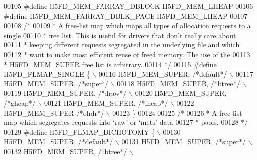 \begin{DoxyCode}
00105 \textcolor{preprocessor}{#define H5FD\_MEM\_FARRAY\_DBLOCK  H5FD\_MEM\_LHEAP}
00106 \textcolor{preprocessor}{#define H5FD\_MEM\_FARRAY\_DBLK\_PAGE  H5FD\_MEM\_LHEAP}
00107 
00108 \textcolor{comment}{/*}
00109 \textcolor{comment}{ * A free-list map which maps all types of allocation requests to a single}
00110 \textcolor{comment}{ * free list.  This is useful for drivers that don't really care about}
00111 \textcolor{comment}{ * keeping different requests segregated in the underlying file and which}
00112 \textcolor{comment}{ * want to make most efficient reuse of freed memory.  The use of the}
00113 \textcolor{comment}{ * H5FD\_MEM\_SUPER free list is arbitrary.}
00114 \textcolor{comment}{ */}
00115 \textcolor{preprocessor}{#define H5FD\_FLMAP\_SINGLE \{                           \(\backslash\)}
00116 \textcolor{preprocessor}{    H5FD\_MEM\_SUPER,         }\textcolor{comment}{/*default*/}\textcolor{preprocessor}{               \(\backslash\)}
00117 \textcolor{preprocessor}{    H5FD\_MEM\_SUPER,         }\textcolor{comment}{/*super*/}\textcolor{preprocessor}{                 \(\backslash\)}
00118 \textcolor{preprocessor}{    H5FD\_MEM\_SUPER,         }\textcolor{comment}{/*btree*/}\textcolor{preprocessor}{                 \(\backslash\)}
00119 \textcolor{preprocessor}{    H5FD\_MEM\_SUPER,         }\textcolor{comment}{/*draw*/}\textcolor{preprocessor}{                  \(\backslash\)}
00120 \textcolor{preprocessor}{    H5FD\_MEM\_SUPER,         }\textcolor{comment}{/*gheap*/}\textcolor{preprocessor}{                 \(\backslash\)}
00121 \textcolor{preprocessor}{    H5FD\_MEM\_SUPER,         }\textcolor{comment}{/*lheap*/}\textcolor{preprocessor}{                 \(\backslash\)}
00122 \textcolor{preprocessor}{    H5FD\_MEM\_SUPER          }\textcolor{comment}{/*ohdr*/}\textcolor{preprocessor}{                  \(\backslash\)}
00123 \textcolor{preprocessor}{\}}
00124 
00125 \textcolor{comment}{/*}
00126 \textcolor{comment}{ * A free-list map which segregates requests into `raw' or `meta' data}
00127 \textcolor{comment}{ * pools.}
00128 \textcolor{comment}{ */}
00129 \textcolor{preprocessor}{#define H5FD\_FLMAP\_DICHOTOMY \{                            \(\backslash\)}
00130 \textcolor{preprocessor}{    H5FD\_MEM\_SUPER,         }\textcolor{comment}{/*default*/}\textcolor{preprocessor}{               \(\backslash\)}
00131 \textcolor{preprocessor}{    H5FD\_MEM\_SUPER,         }\textcolor{comment}{/*super*/}\textcolor{preprocessor}{                 \(\backslash\)}
00132 \textcolor{preprocessor}{    H5FD\_MEM\_SUPER,         }\textcolor{comment}{/*btree*/}\textcolor{preprocessor}{                 \(\backslash\)}

\end{DoxyCode}
